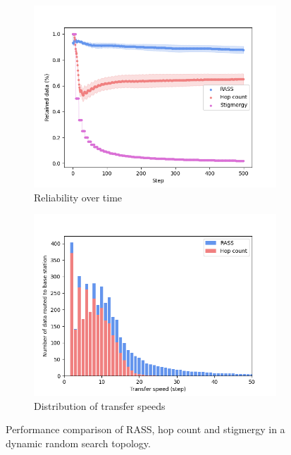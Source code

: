 \begin{figure}
    \centering
    \begin{subfigure}{0.8\textwidth}
        \includegraphics[width=\textwidth]{images/random_reliability.png}
        \caption{Reliability over time}
        \label{results:random_100_reliability}
    \end{subfigure}
    \begin{subfigure}{0.8\textwidth}
        \includegraphics[width=\textwidth]{images/random_speed.png}
        \caption{Distribution of transfer speeds}
        \label{results:random_100_speed}
    \end{subfigure}
    \caption{Performance comparison of RASS, hop count and stigmergy in a dynamic random search topology.}
    \label{results:dynamicTopologyRandom}
    \vspace{-2mm}
\end{figure}

